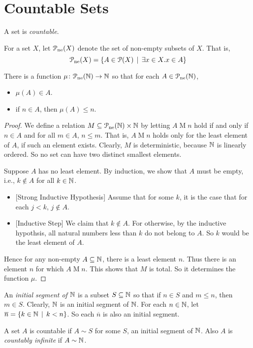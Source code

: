 \chapter{Countable Sets}

A set is \emph{countable}.

\begin{defn}
	For a set $X$, let ${\mathcal{P}}_{\text{ne}}(X)$ denote the set of non-empty subsets of $X$. That is, \[{\mathcal{P}}_{\text{ne}}(X) = \{A\in{\mathcal{P}}(X)\,\mid\, \exists x\in X.x\in A\}\]
\end{defn}

\begin{lemma}
	There is a function ${\mu}\colon{{\mathcal{P}}_{\text{ne}}({\mathbb N})}\to{{\mathbb N}}$ so that for each $A\in {\mathcal{P}}_{\text{ne}}({\mathbb N})$, 
	\begin{itemize}
		\item $\mu(A)\in A$.
		\item if $n\in A$, then $\mu(A)\leq n$.
	\end{itemize}
	
	\begin{proof}
		We define a relation $M\subseteq{{\mathcal{P}}_{\text{ne}}({\mathbb N})\times {\mathbb N}}$ by letting $A\mathrel{M} n$ hold if and only if $n\in A$ and for all $m\in A$, $n\leq m$. 
		That is, $A\mathrel{M} n$ holds only for the least element of $A$, if such an element exists.
		Clearly, $M$ is deterministic, because ${\mathbb N}$ is linearly ordered.
		So no set can have two distinct smallest elements.
		
		Suppose $A$ has no least element. By induction, we show that $A$ must be empty, i.e., $k\notin A$ for all $k\in {\mathbb N}$.
		\begin{itemize}
			\item{}[Strong Inductive Hypothesis] Assume that for some $k$, it is the case that for each $j<k$, $j\notin A$. 
			\item{}[Inductive Step] We claim that $k\notin A$. 
			For otherwise, by the inductive hypothsis, all natural numbers less than $k$ do not belong to $A$. 
			So $k$ would be the least element of $A$. 
		\end{itemize} 
		Hence for any non-empty $A\subseteq {\mathbb N}$, there is a least element $n$. 
		Thus there is an element $n$ for which $A\mathrel{M}n$. 
		This shows that $M$ is total. 
		So it determines the function $\mu$.
	\end{proof}
\end{lemma}

\begin{defn}
An \emph{initial segment of ${\mathbb N}$} is a subset $S\subseteq {\mathbb N}$ so that if $n\in S$ and $m\leq n$, then $m\in S$. Clearly, ${\mathbb N}$ is an initial segment of ${\mathbb N}$.
For each $n\in {\mathbb N}$, let $\overline n = \{k\in {\mathbb N}\,\mid\, k<n\}$. So each $\overline n$ is also an initial segment.

A set $A$ is countable if $A\sim S$ for some $S$, an initial segment of ${\mathbb N}$. Also $A$ is \emph{countably infinite} if $A\sim {\mathbb N}$.
\end{defn}

